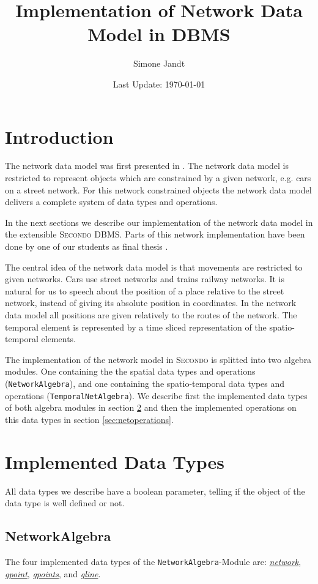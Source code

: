 \documentclass[a4paper]{article}
\title{Implementation of Network Data Model in \secondo{}DBMS}
\author{Simone Jandt}
\date{Last Update: \today}
\newcommand{\secondo}{\textsc{Secondo}}
\newcommand{\dt}[1]{\textsl{\underline{#1}}}
\newcommand{\file}[1]{\texttt{#1}}
\begin{document}
\maketitle
\tableofcontents
\section{Introduction}
The network data model was first presented in \cite{1146465}. The network data model is restricted to represent objects which are constrained by a given network, e.g. cars on a street network. For this network constrained  objects the network data model delivers a complete system of data types and operations.

In the next sections we describe our implementation of the network data model in the extensible \secondo{} DBMS\cite{686903,1054151,secondoweb}. Parts of this network implementation have been done by one of our students as final thesis \cite{DAScheppokat}.

The central idea of the network data model is that movements are restricted to given networks. Cars use street networks and trains railway networks. It is natural for us to speech about the position of a place relative to the street network, instead of giving its absolute position in coordinates. In the network data model all positions are given relatively to the routes of the network. The temporal element is represented by a time sliced representation of the spatio-temporal elements.

The implementation of the network model in \secondo{} is splitted into two algebra modules. One containing the the spatial data types and operations (\file{NetworkAlgebra}), and one containing the spatio-temporal data types and operations (\file{TemporalNetAlgebra}). We describe first the implemented data types of both algebra modules in section \ref{sec:netdatatypes} and then the implemented operations on this data types in section \ref{sec:netoperations}.
\section{Implemented Data Types}
\label{sec:netdatatypes}
All data types we describe have a boolean parameter, telling if the object of the data type is well defined or not. 
\subsection{NetworkAlgebra}
The four implemented data types of the \file{NetworkAlgebra}-Module are: \dt{network}, \dt{gpoint}, \dt{gpoints}, and \dt{gline}.
\end{document}
